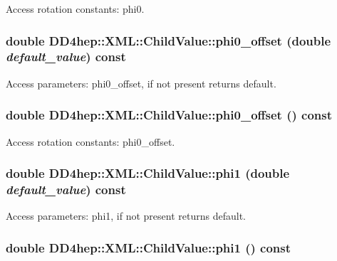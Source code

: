 Access rotation constants: phi0. \hypertarget{struct_d_d4hep_1_1_x_m_l_1_1_child_value_afe926d4307e54d8193b04a0f6589d424}{
\subsubsection[{phi0\_\-offset}]{\setlength{\rightskip}{0pt plus 5cm}double DD4hep::XML::ChildValue::phi0\_\-offset (double {\em default\_\-value}) const}}
\label{struct_d_d4hep_1_1_x_m_l_1_1_child_value_afe926d4307e54d8193b04a0f6589d424}


Access parameters: phi0\_\-offset, if not present returns default. \hypertarget{struct_d_d4hep_1_1_x_m_l_1_1_child_value_ae26b7e2af1bf644950346f2d52d37578}{
\subsubsection[{phi0\_\-offset}]{\setlength{\rightskip}{0pt plus 5cm}double DD4hep::XML::ChildValue::phi0\_\-offset () const}}
\label{struct_d_d4hep_1_1_x_m_l_1_1_child_value_ae26b7e2af1bf644950346f2d52d37578}


Access rotation constants: phi0\_\-offset. \hypertarget{struct_d_d4hep_1_1_x_m_l_1_1_child_value_af8036a9f65c386ce0980839388531211}{
\subsubsection[{phi1}]{\setlength{\rightskip}{0pt plus 5cm}double DD4hep::XML::ChildValue::phi1 (double {\em default\_\-value}) const}}
\label{struct_d_d4hep_1_1_x_m_l_1_1_child_value_af8036a9f65c386ce0980839388531211}


Access parameters: phi1, if not present returns default. \hypertarget{struct_d_d4hep_1_1_x_m_l_1_1_child_value_aa2a8fb87222bd7d6517a657622f9cbc4}{
\subsubsection[{phi1}]{\setlength{\rightskip}{0pt plus 5cm}double DD4hep::XML::ChildValue::phi1 () const}}
\label{struct_d_d4hep_1_1_x_m_l_1_1_child_value_aa2a8fb87222bd7d6517a657622f9cbc4}


